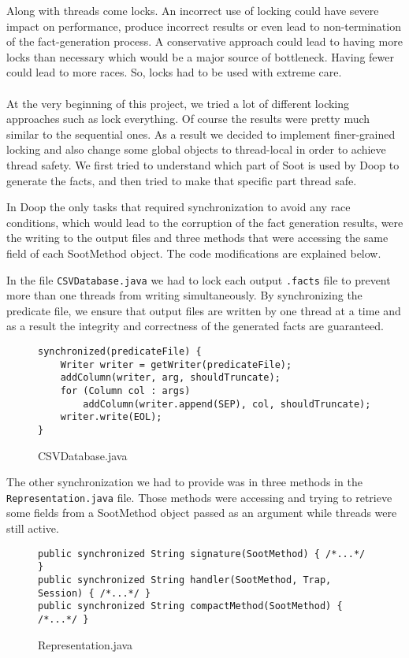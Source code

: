 \documentclass{dithesis}
\begin{document}
\label{Ch:Locking}
	Along with threads come locks. An incorrect use of locking could have severe impact on performance, produce incorrect results or even lead to non-termination of the fact-generation process. A conservative approach could lead to having more locks than necessary which would be a major source of bottleneck. Having fewer could lead to more races. So, locks had to be used with extreme care.
    \\
    \\
	At the very beginning of this project, we tried a lot of different locking approaches such as lock everything. Of course the results were pretty much similar to the sequential ones. As a result we decided to implement finer-grained locking and also change some global objects to thread-local in order to achieve thread safety. We first tried to understand which part of Soot is used by Doop to generate the facts, and then tried to make that specific part thread safe.


    	In Doop the only tasks that required synchronization to avoid any race conditions, which would lead to the corruption of the fact generation results, were the writing to the output files and three methods that were accessing the same field of each SootMethod object. The code modifications are explained below.

	    	In the file \texttt{CSVDatabase.java} we had to lock each output \texttt{.facts} file to prevent more than one threads from writing simultaneously. By synchronizing the predicate file, we ensure that output files are written by one thread at a time and as a result the integrity and correctness of the generated facts are guaranteed.
	    	\begin{figure}[H]
\begin{lstlisting}
synchronized(predicateFile) {
    Writer writer = getWriter(predicateFile);
    addColumn(writer, arg, shouldTruncate);
    for (Column col : args)
        addColumn(writer.append(SEP), col, shouldTruncate);
    writer.write(EOL);
}
\end{lstlisting}
	        \caption{CSVDatabase.java}
	        \end{figure}

	    	The other synchronization we had to provide was in three methods in the \texttt{Representation.java} file. Those methods were accessing and trying to retrieve some fields from a SootMethod object passed as an argument while threads were still active.
	    	\begin{figure}[H]
\begin{lstlisting}
public synchronized String signature(SootMethod) { /*...*/ }
public synchronized String handler(SootMethod, Trap, Session) { /*...*/ }
public synchronized String compactMethod(SootMethod) { /*...*/ }
\end{lstlisting}
	        \caption{Representation.java}
	        \end{figure}
\end{document}
